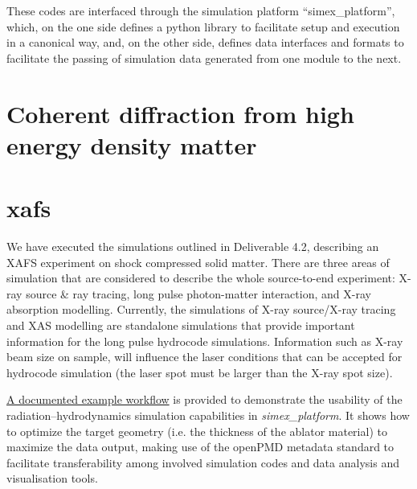 \documentclass[12pt]{scrartcl}
\begin{document}
These codes are interfaced through the simulation platform ``simex\_platform'', which,
on the one side defines a python library to facilitate setup
and execution in a canonical way, and, on the other side, defines data interfaces
and formats to facilitate the passing of simulation data generated from one
module to the next.

\section{Coherent diffraction from high energy density matter}\label{sec:plasma_diffraction}


\section{\Gls{xafs}\label{sec:xafs}}
%
We have executed the simulations outlined in Deliverable
4.2\cite{EUCALL_SIMEX_D4.2}, describing an XAFS experiment on shock compressed
solid matter. There are three areas of simulation that are considered to describe the
whole source-to-end experiment: X-ray source \& ray tracing, long pulse photon-matter
interaction, and X-ray absorption modelling. Currently, the simulations of X-ray
source/X-ray tracing and XAS modelling are standalone simulations that provide
important information for the long pulse hydrocode simulations. Information
such as X-ray beam size on sample, will influence the laser conditions that can
be accepted for hydrocode simulation (the laser spot must be larger than the
X-ray spot size).



\href{https://www.github.com/eucall-software/simex_platform/wiki/Esther-Hydrocode-Tutorial}{A
documented example workflow} is provided to demonstrate the usability of the
radiation--hydrodynamics simulation capabilities in \textit{simex\_platform}. It
shows how to optimize the target geometry (i.e. the thickness of the ablator
material) to maximize the data output, making use of the openPMD metadata
standard to facilitate transferability among involved simulation codes and
data analysis and visualisation tools.
%
\end{document}
